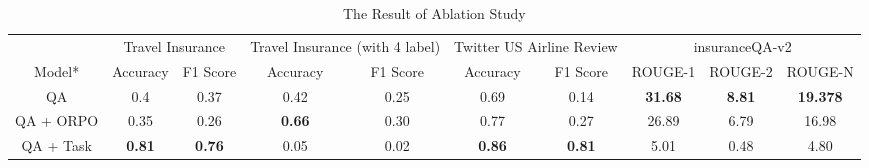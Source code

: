 \documentclass[conference]{IEEEtran}
\begin{document}
\begin{table}[h]
\caption{The Result of Ablation Study}


\fontsize{8pt}{13pt}\selectfont %
\begin{tabular}{@{}cccccccccc@{}}
\toprule
                                                                                    & \multicolumn{2}{c}{Travel Insurance}                                        & \multicolumn{2}{c}{Travel Insurance (with 4 label)}                         & \multicolumn{2}{c}{Twitter US Airline Review}                               & \multicolumn{3}{c}{insuranceQA-v2}                                                                                    \\ \cmidrule(l){2-10} 
\multirow{-2}{*}{Model*}                                                             & Accuracy                             & F1 Score                             & Accuracy                             & F1 Score                             & Accuracy                             & F1 Score                             & ROUGE-1                               & ROUGE-2                              & ROUGE-N                                \\ \midrule
QA                                                                                  & 0.4                                  & 0.37                                 & 0.42                                 & 0.25                                 & 0.69                                 & 0.14                                 & {\color[HTML]{CB0000} \textbf{31.68}} & {\color[HTML]{CB0000} \textbf{8.81}} & {\color[HTML]{CB0000} \textbf{19.378}} \\
QA + ORPO                                                                           & 0.35                                 & 0.26                                 & {\color[HTML]{CB0000} \textbf{0.66}} & 0.30                                 & 0.77                                 & 0.27                                 & 26.89                                 & 6.79                                 & 16.98                                  \\
QA + Task                                                                           & {\color[HTML]{CB0000} \textbf{0.81}} & {\color[HTML]{CB0000} \textbf{0.76}} & 0.05                                 & 0.02                                 & {\color[HTML]{CB0000} \textbf{0.86}} & {\color[HTML]{CB0000} \textbf{0.81}} & 5.01                                  & 0.48                                 & 4.80                                   \\

\end{tabular}
\end{table}
\end{document}
